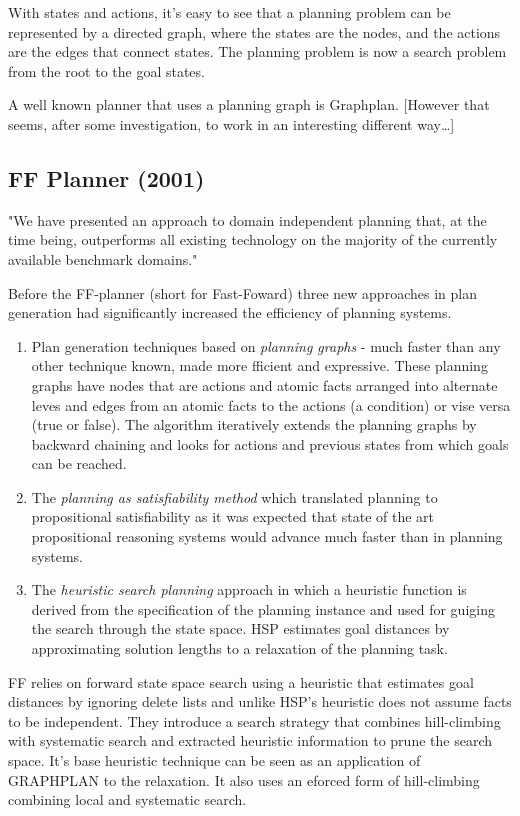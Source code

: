 \documentclass[runningheads,a4paper]{llncs}
\begin{document}
With states and actions, it's easy to see that a planning problem can be
represented by a directed graph, where the states are the nodes, and the
actions are the edges that connect states. The planning problem is now
a search problem from the root to the goal states.

A well known planner that uses a planning graph is Graphplan.
[However that seems, after some investigation, to work in an interesting
different way\ldots]

\subsection{FF Planner (2001)}

"We have presented an approach to domain independent planning that, at the time being, outperforms all existing technology on the majority of the currently available benchmark domains."

Before the FF-planner (short for Fast-Foward) three new approaches in plan generation had significantly increased the efficiency of planning systems\cite{Hoffmann01theff}. 

\begin{enumerate}
	\item Plan generation techniques based on \emph{planning graphs} - much faster than any other technique known, made more fficient and expressive. These planning graphs have nodes that are actions and atomic facts arranged into alternate leves and edges from an atomic facts to the actions (a condition) or vise versa (true or false). The algorithm iteratively extends the planning graphs by backward chaining and looks for actions and previous states from which goals can be reached. %

	\item The \emph{planning as satisfiability method} which translated planning to propositional satisfiability as it was expected that state of the art propositional reasoning systems would advance much faster than in planning systems.

	\item The \emph{heuristic search planning} approach in which a heuristic function is derived from the specification of the planning instance and used for guiging the search through the state space. HSP estimates goal distances by approximating solution lengths to a relaxation of the planning task. 
\end{enumerate}

FF relies on forward state space search using a heuristic that estimates goal distances by ignoring delete lists and unlike HSP's heuristic does not assume facts to be independent. They introduce a search strategy that combines hill-climbing with systematic search and extracted heuristic information to prune the search space. It's base heuristic technique can be seen as an application of GRAPHPLAN to the relaxation. It also uses an eforced form of hill-climbing combining local and systematic search. 
\end{document}
